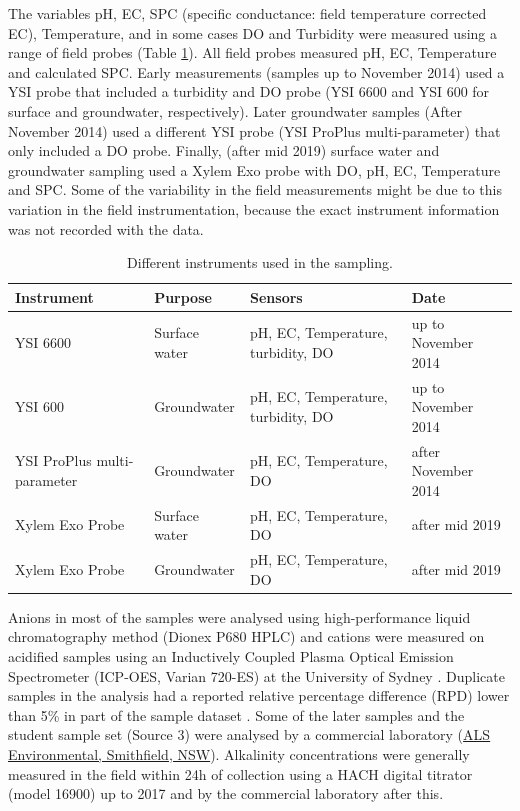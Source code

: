 \documentclass[, manuscript]{copernicus}
\begin{document}
The variables pH, EC, SPC (specific conductance: field temperature
corrected EC), Temperature, and in some cases DO and Turbidity were
measured using a range of field probes (Table
\ref{tab:TableInstruments}). All field probes measured pH, EC,
Temperature and calculated SPC. Early measurements (samples up to
November 2014) used a YSI probe that included a turbidity and DO probe
(YSI 6600 and YSI 600 for surface and groundwater, respectively). Later
groundwater samples (After November 2014) used a different YSI probe
(YSI ProPlus multi-parameter) that only included a DO probe. Finally,
(after mid 2019) surface water and groundwater sampling used a Xylem Exo
probe with DO, pH, EC, Temperature and SPC. Some of the variability in
the field measurements might be due to this variation in the field
instrumentation, because the exact instrument information was not
recorded with the data.

\begin{table}
\centering
\caption{\label{tab:TableInstruments}Different instruments used in the sampling.}
\centering
\begin{tabular}[t]{l|l|l|l}
\hline
Instrument & Purpose & Sensors & Date\\
\hline
YSI 6600 & Surface water & pH, EC, Temperature, turbidity, DO & up to November 2014\\
\hline
YSI 600 & Groundwater & pH, EC, Temperature, turbidity, DO & up to November 2014\\
\hline
YSI ProPlus multi-parameter & Groundwater & pH, EC, Temperature, DO & after November 2014\\
\hline
Xylem Exo Probe & Surface water & pH, EC, Temperature, DO & after mid 2019\\
\hline
Xylem Exo Probe & Groundwater & pH, EC, Temperature, DO & after mid 2019\\
\hline
\end{tabular}
\end{table}

Anions in most of the samples were analysed using high-performance
liquid chromatography method (Dionex P680 HPLC) and cations were
measured on acidified samples using an Inductively Coupled Plasma
Optical Emission Spectrometer (ICP-OES, Varian 720-ES) at the University
of Sydney \citep{Akter2018}. Duplicate samples in the analysis had a
reported relative percentage difference (RPD) lower than 5\% in part of
the sample dataset \citep{Akter2018}. Some of the later samples and the
student sample set (Source 3) were analysed by a commercial laboratory
(\href{https://www.alsglobal.com/en/locations/asia-pacific/pacific/australia/nsw/sydney-woodpark-environmental}{ALS
Environmental, Smithfield, NSW}). Alkalinity concentrations were
generally measured in the field within 24h of collection using a HACH
digital titrator (model 16900) \citep{Akter2018} up to 2017 and by the
commercial laboratory after this.
\end{document}

